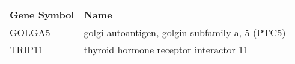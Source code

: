 \begin{tabular}{ll}
\toprule
Gene Symbol &                                             Name \\
\midrule
     GOLGA5 & golgi autoantigen, golgin subfamily a, 5  (PTC5) \\
     TRIP11 &           thyroid hormone receptor interactor 11 \\
\bottomrule
\end{tabular}
